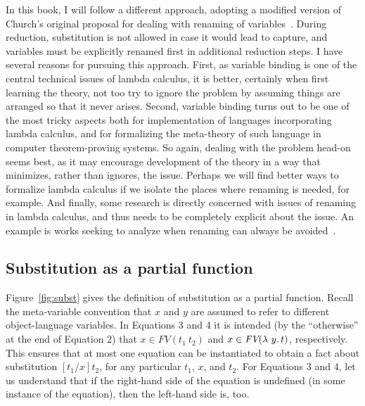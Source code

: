  In this book, I will follow a different approach, adopting a modified
 version of Church's original proposal for dealing with renaming of
 variables~\cite{church41}.  During reduction, substitution is not
 allowed in case it would lead to capture, and variables must be
 explicitly renamed first in additional reduction steps.  I have
 several reasons for pursuing this approach.  First, as variable
 binding is one of the central technical issues of lambda calculus, it
 is better, certainly when first learning the theory, not too try to
 ignore the problem by assuming things are arranged so that it never
 arises.  Second, variable binding turns out to be one of the most
 tricky aspects both for implementation of languages incorporating
 lambda calculus, and for formalizing the meta-theory of such
 language in computer theorem-proving systems.  So again, dealing with
 the problem head-on seems best, as it may encourage development of the theory
 in a way that minimizes, rather than ignores, the issue.  Perhaps
 we will find better ways to formalize lambda calculus if we isolate
 the places where renaming is needed, for example.  And finally,
 some research is directly concerned with issues of renaming
 in lambda calculus, and thus needs to be completely explicit about
 the issue.  An example is works seeking to analyze when renaming
 can always be avoided~\cite{vanoostrom23}.


\subsection{Substitution as a partial function}

Figure~\ref{fig:subst} gives the definition of substitution as a
partial function.  Recall the meta-variable convention that $x$ and
$y$ are assumed to refer to different object-language variables.  In
Equations 3 and 4 it is intended (by the ``otherwise'' at the end of Equation 2)
that $x\in\textit{FV}(t_1\ t_2)$ and $x\in\textit{FV}(\lambda\ y.\, t)$,
respectively.  This ensures that at most one equation can be
instantiated to obtain a fact about substitution $[t_1/x]t_2$, for any
particular $t_1$, $x$, and $t_2$.  For Equations 3 and 4, let us
understand that if the right-hand side of the equation is undefined
(in some instance of the equation), then the left-hand side is, too.

